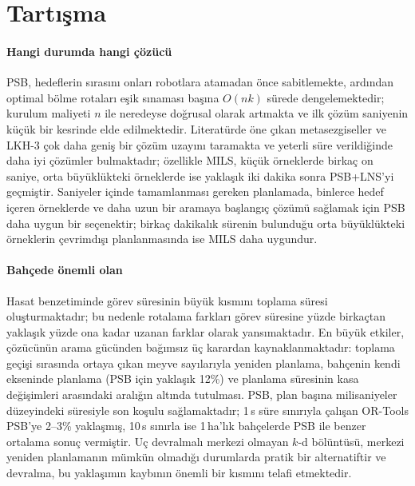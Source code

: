 \section{Tartışma}\label{sec:discussion}

\paragraph{Hangi durumda hangi çözücü} PSB, hedeflerin sırasını onları robotlara atamadan önce
sabitlemekte, ardından optimal bölme rotaları eşik sınaması başına $O(nk)$ sürede dengelemektedir;
kurulum maliyeti $n$ ile neredeyse doğrusal olarak artmakta ve ilk çözüm saniyenin küçük bir
kesrinde elde edilmektedir. Literatürde öne çıkan
metasezgiseller ve LKH-3 çok daha geniş bir çözüm uzayını taramakta ve yeterli süre verildiğinde
daha iyi çözümler bulmaktadır; özellikle MILS, küçük örneklerde birkaç on saniye, orta büyüklükteki
örneklerde ise yaklaşık iki dakika sonra PSB+LNS'yi geçmiştir. Saniyeler içinde tamamlanması
gereken planlamada, binlerce hedef içeren örneklerde ve daha uzun bir aramaya başlangıç
çözümü sağlamak için PSB daha uygun bir seçenektir; birkaç dakikalık sürenin bulunduğu orta büyüklükteki örneklerin
çevrimdışı planlanmasında ise MILS daha uygundur.

\paragraph{Bahçede önemli olan} Hasat benzetiminde görev süresinin büyük kısmını toplama süresi oluşturmaktadır;
bu nedenle rotalama farkları görev süresine yüzde birkaçtan yaklaşık yüzde ona kadar uzanan
farklar olarak yansımaktadır. En büyük etkiler, çözücünün arama gücünden bağımsız üç karardan
kaynaklanmaktadır: toplama geçişi sırasında ortaya çıkan meyve sayılarıyla yeniden planlama,
bahçenin kendi ekseninde planlama (PSB için yaklaşık 12\%) ve planlama süresinin kasa
değişimleri arasındaki aralığın altında tutulması. PSB, plan başına milisaniyeler düzeyindeki süresiyle son
koşulu sağlamaktadır; 1\,s süre sınırıyla çalışan OR-Tools PSB'ye 2--3\% yaklaşmış, 10\,s sınırla ise
1\,ha'lık bahçelerde PSB ile benzer ortalama sonuç vermiştir. Uç devralmalı merkezi olmayan $k$-d
bölüntüsü, merkezi yeniden planlamanın mümkün olmadığı durumlarda pratik bir alternatiftir
ve devralma, bu yaklaşımın kaybının önemli bir kısmını telafi etmektedir.


